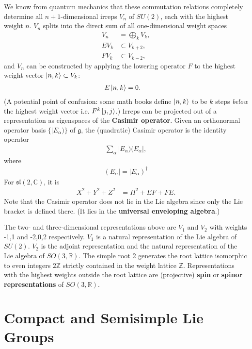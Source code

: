 \documentclass[aps,nofootinbib]{revtex4}
\begin{document}
\begin{enumerate}
We know from quantum mechanics that these commutation relations completely determine all $n+1$-dimensional irreps $V_n$ of $SU(2)$, each with the highest weight $n$. $V_n$ splits into the direct sum of all one-dimensional weight spaces
\begin{align*}
V_n &= \bigoplus_k V_k,\\
EV_k &\subset V_{k+2},\\
FV_k &\subset V_{k-2},
\end{align*}
and $V_n$ can be constructed by applying the lowering operator $F$ to the highest weight vector $ \ket{n,k} \subset V_k$:
\begin{align*}
E\ket{n,k} &= 0.
\end{align*}
(A potential point of confusion: some math books define $\ket{n,k}$ to be $k$ steps \emph{below} the highest weight vector i.e. $F^k\ket{j,j}$.)
Irreps can be projected out of a representation as eigenspaces of the {\bf Casimir operator}. Given an orthonormal operator basis $\{|E_{\alpha}) \}$ of $\mathfrak{g}$, the (quadratic) Casimir operator is the identity operator
\begin{align*}
\sum_{\alpha} |E_{\alpha})(E_{\alpha}|,
\end{align*}
where
\begin{align*}
(E_{\alpha}|=|E_{\alpha})^{\dagger}
\end{align*}
For $\mathfrak{sl}(2,\mathbb{C})$, it is
\begin{align*}
X^2+Y^2+Z^2 &= H^2 + EF + FE.
\end{align*}
Note that the Casimir operator does not lie in the Lie algebra since only the Lie bracket is defined there. (It lies in the {\bf universal enveloping algebra}.)

The two- and three-dimensional representations above are $V_1$ and $V_2$ with weights -1,1 and -2,0,2 respectively. $V_1$ is a natural representation of the Lie algebra of $SU(2)$. $V_2$ is the adjoint representation and the natural representation of the Lie algebra of $SO(3,\mathbb{R})$. The simple root 2 generates the root lattice isomorphic to even integers $2\mathbb{Z}$ strictly contained in the weight lattice $\mathbb{Z}$. Representations with the highest weights outside the root lattice are (projective) {\bf spin} or {\bf spinor representations} of $SO(3,\mathbb{R})$.

\end{enumerate}

\section{Compact and Semisimple Lie Groups}
\end{document}
